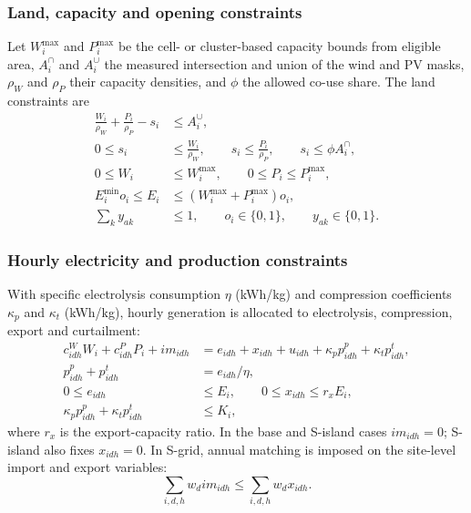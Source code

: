 
\subsubsection{Land, capacity and opening constraints}
Let $W_i^{\max}$ and $P_i^{\max}$ be the cell- or cluster-based capacity bounds
from eligible area, $A_i^{\cap}$ and $A_i^{\cup}$ the measured intersection
and union of the wind and PV masks, $\rho_W$ and $\rho_P$ their capacity
densities, and $\phi$ the allowed co-use share. The land constraints are
\begin{equation}
\begin{aligned}
\frac{W_i}{\rho_W}+\frac{P_i}{\rho_P}-s_i &\le A_i^{\cup},\\
0\le s_i &\le \frac{W_i}{\rho_W},\qquad
s_i\le \frac{P_i}{\rho_P},\qquad s_i\le \phi A_i^{\cap},\\
0\le W_i &\le W_i^{\max},\qquad 0\le P_i\le P_i^{\max},\\
E_i^{\min}o_i\le E_i &\le (W_i^{\max}+P_i^{\max})o_i,\\
\textstyle\sum_{k}y_{ak}&\le 1,\qquad o_i\in\{0,1\},\qquad y_{ak}\in\{0,1\}.
\end{aligned}
\label{eq:s5_land_open}
\end{equation}

\subsubsection{Hourly electricity and production constraints}
With specific electrolysis consumption $\eta$ (kWh/kg) and compression
coefficients $\kappa_p$ and $\kappa_t$ (kWh/kg), hourly generation is allocated
to electrolysis, compression, export and curtailment:
\begin{equation}
\begin{aligned}
c^W_{idh}W_i+c^P_{idh}P_i+im_{idh}
 &= e_{idh}+x_{idh}+u_{idh}+\kappa_p p^p_{idh}+\kappa_t p^t_{idh},\\
p^p_{idh}+p^t_{idh} &= e_{idh}/\eta,\\
0\le e_{idh} &\le E_i,\qquad 0\le x_{idh}\le r_xE_i,\\
\kappa_p p^p_{idh}+\kappa_t p^t_{idh} &\le K_i,
\end{aligned}
\label{eq:s5_electricity}
\end{equation}
where $r_x$ is the export-capacity ratio. In the base and S-island cases
$im_{idh}=0$; S-island also fixes $x_{idh}=0$. In S-grid, annual matching is
imposed on the site-level import and export variables:
\begin{equation}
\sum_{i,d,h}w_d im_{idh}\le \sum_{i,d,h}w_d x_{idh}.
\label{eq:s5_matching}
\end{equation}

